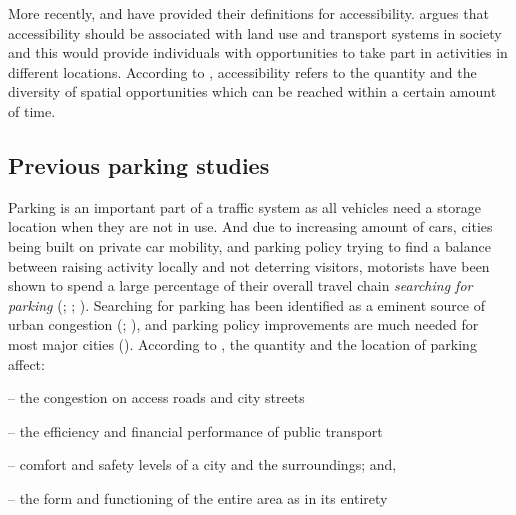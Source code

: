 More recently,  and  have provided their definitions for accessibility. \citeauthor{Geurs2004} argues that accessibility should be associated with land use and transport systems in society and this would provide individuals with opportunities to take part in activities in different locations. According to \cite{Bertolini2003}, accessibility refers to the quantity and the diversity of spatial opportunities which can be reached within a certain amount of time.

\newpage
\subsection{Previous parking studies}
\justify

Parking is an important part of a traffic system as all vehicles need a storage location when they are not in use. And due to increasing amount of cars, cities being built on private car mobility, and parking policy trying to find a balance between raising activity locally and not deterring visitors, motorists have been shown to spend a large percentage of their overall travel chain \textit{searching for parking} (\cite{Axhausen1991}; \cite{Marsden2006}; \cite{Shoup2006}). Searching for parking has been identified as a eminent source of urban congestion (\cite{Axhausen1993}; \cite{Gantelet2006}), and parking policy improvements are much needed for most major cities (\cite{Benenson2008a}). According to , the quantity and the location of parking affect:

\begin{itemize}
    \begin{singlespace}
        \item[--] the congestion on access roads and city streets
        \item[--] the efficiency and financial performance of public transport
        \item[--] comfort and safety levels of a city and the surroundings; and,
        \item[--] the form and functioning of the entire area as in its entirety
    \end{singlespace}
\end{itemize}


